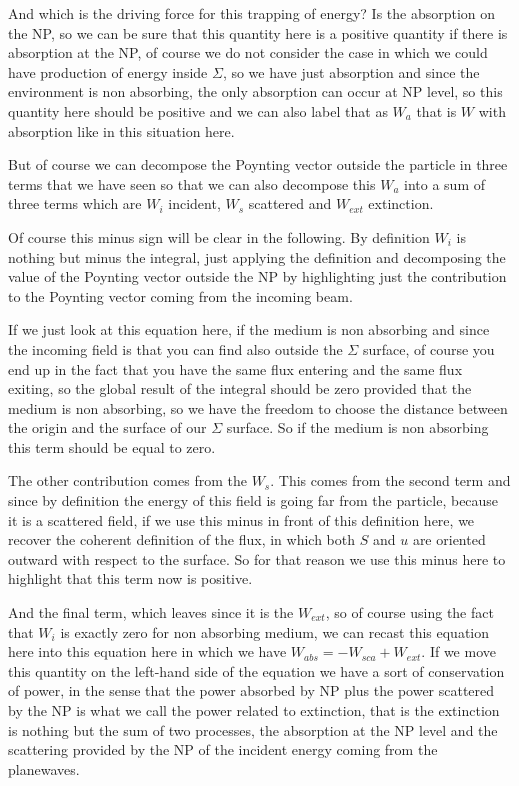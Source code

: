 \documentclass[../main/main.tex]{subfiles}
\begin{document}
And which is the driving force for this trapping of energy? Is the absorption on the NP, so we can be sure that this quantity here is a positive quantity if there is absorption at the NP, of course we do not consider the case in which we could have production of energy inside $\Sigma$, so we have just absorption and since the environment is non absorbing, the only absorption can occur at NP level, so this quantity here should be positive and we can also label that as $W_a$ that is $W$ with absorption like in this situation here.

But of course we can decompose the Poynting vector outside the particle in three terms that we have seen so that we can also decompose this $W_a$ into a sum of three terms which are $W_{i}$ incident, $W_{s}$ scattered and $W_{ext}$ extinction.

Of course this minus sign will be clear in the following. By definition $W_i$ is nothing but minus the integral, just applying the definition and decomposing the value of the Poynting vector outside the NP by highlighting just the contribution to the Poynting vector coming from the incoming beam.

If we just look at this equation here, if the medium is non absorbing and since the incoming field is that you can find also outside the $\Sigma$ surface, of course you end up in the fact that you have the same flux entering and the same flux exiting, so the global result of the integral should be zero provided that the medium is non absorbing, so we have the freedom to choose the distance between the origin and the surface of our $\Sigma$ surface. So if the medium is non absorbing this term should be equal to zero.

The other contribution comes from the $W_s$. This comes from the second term and since by definition the energy of this field is going far from the particle, because it is a scattered field, if we use this minus in front of this definition here, we recover the coherent definition of the flux, in which both $S$ and $u$ are oriented outward with respect to the surface. So for that reason we use this minus here to highlight that this term now is positive.

And the final term, which leaves since it is the $W_{ext}$, so of course using the fact that $W_i$ is exactly zero for non absorbing medium, we can recast this equation here into this equation here in which we have $W_{abs}=-W_{sca}+W_{ext}$. If we move this quantity on the left-hand side of the equation we have a sort of conservation of power, in the sense that the power absorbed by NP plus the power scattered by the NP is what we call the power related to extinction, that is the extinction is nothing but the sum of two processes, the absorption at the NP level and the scattering provided by the NP of the incident energy coming from the planewaves. 
\end{document}
